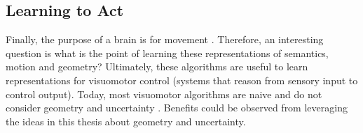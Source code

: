 \subsection{Learning to Act}
Finally, the purpose of a brain is for movement \citep{wolpert2000computational}. Therefore, an interesting question is what is the point of learning these representations of semantics, motion and geometry? Ultimately, these algorithms are useful to learn representations for visuomotor control (systems that reason from sensory input to control output). Today, most visuomotor algorithms are naive and do not consider geometry and uncertainty \citep{levine2016end,kendall2018learning}. Benefits could be observed from leveraging the ideas in this thesis about geometry and uncertainty.
